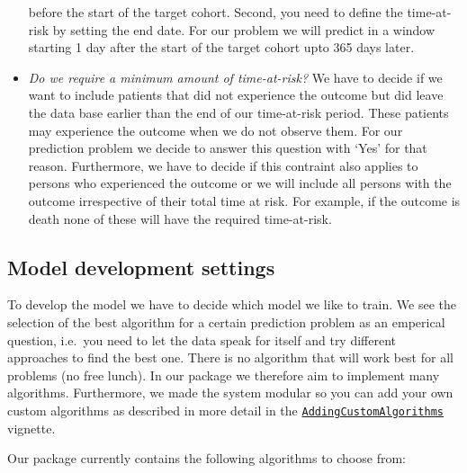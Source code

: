 \documentclass[]{article}
\begin{document}
\begin{itemize}
  before the start of the target cohort. Second, you need to define the
  time-at-risk by setting the end date. For our problem we will predict
  in a window starting 1 day after the start of the target cohort upto
  365 days later.
\item
  \emph{Do we require a minimum amount of time-at-risk?} We have to
  decide if we want to include patients that did not experience the
  outcome but did leave the data base earlier than the end of our
  time-at-risk period. These patients may experience the outcome when we
  do not observe them. For our prediction problem we decide to answer
  this question with `Yes' for that reason. Furthermore, we have to
  decide if this contraint also applies to persons who experienced the
  outcome or we will include all persons with the outcome irrespective
  of their total time at risk. For example, if the outcome is death none
  of these will have the required time-at-risk.
\end{itemize}

\subsection{Model development
settings}\label{model-development-settings}

To develop the model we have to decide which model we like to train. We
see the selection of the best algorithm for a certain prediction problem
as an emperical question, i.e.~you need to let the data speak for itself
and try different approaches to find the best one. There is no algorithm
that will work best for all problems (no free lunch). In our package we
therefore aim to implement many algorithms. Furthermore, we made the
system modular so you can add your own custom algorithms as described in
more detail in the
\href{Link\%20to\%20be\%20added}{\texttt{AddingCustomAlgorithms}}
vignette.

Our package currently contains the following algorithms to choose from:
\end{document}
